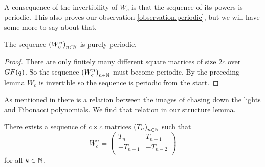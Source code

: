 A consequence of the invertibility of $W_{c}$ is that the sequence of its powers
is periodic. This also proves our observation \ref{observation.periodic}, but we
will have some more to say about that.

\begin{theorem}
  The sequence $\left(W_{c}^{n}\right)_{n\in\mathbb{N}}$ is purely periodic.
\end{theorem}

\begin{proof}
  There are only finitely many different square matrices of size $2c$ over
  $GF(q)$. So the sequence $\left(W_{c}^{n}\right)_{n\in\mathbb{N}}$ must
  become periodic. By the preceding lemma $W_{c}$ is invertible so the
  sequence is periodic from the start.
\end{proof}

As mentioned in \cite{leach17} there is a relation between the images of chasing
down the lights and Fibonacci polynomials. We find that relation in our
structure lemma.

\begin{lemma}[structure]
  There exists a sequence of $c \times c$ matrices
  $\left(T_{n}\right)_{n\in\mathbb{N}}$ such that
  \[
  W_{c}^{n}
  =
  \left(
  \begin{array}{cc}
     T_{n} &  T_{n-1} \\
    -T_{n-1} & -T_{n-2}   \\
  \end{array}
  \right)
  \]
  for all $k\in\mathbb{N}$.
\end{lemma}

